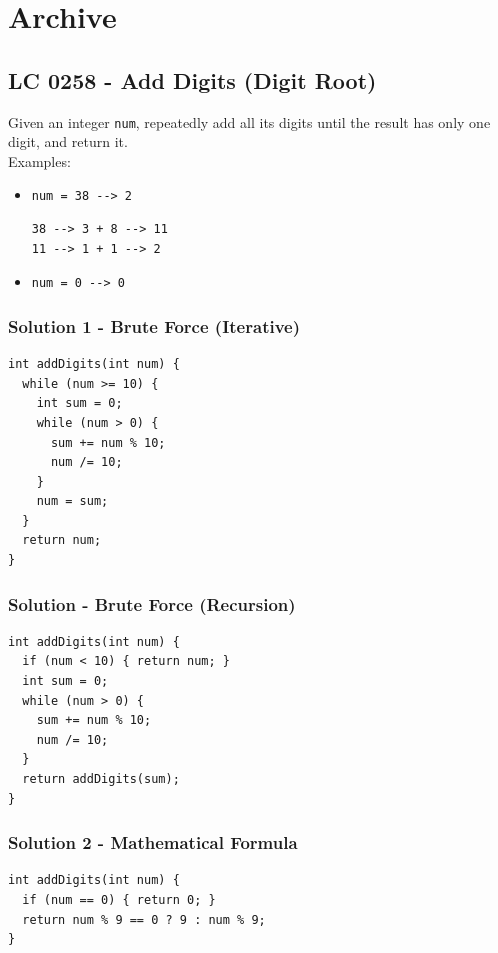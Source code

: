 \chapter{Archive}
\section{LC 0258 - Add Digits (Digit Root)}
Given an integer {\colorbox{CodeBackground}{\lstinline|num|}}, repeatedly add all its digits until the result has only one digit, and return it.\\

Examples:
\begin{itemize}
\item {\colorbox{CodeBackground}{\lstinline|num = 38 --> 2|}}
\begin{lstlisting}
38 --> 3 + 8 --> 11
11 --> 1 + 1 --> 2 
\end{lstlisting}
\item {\colorbox{CodeBackground}{\lstinline|num = 0 --> 0|}}
\end{itemize}

\subsection*{Solution 1 - Brute Force (Iterative)}\label{solution:lc0258_simulation_iterative}
\begin{lstlisting}
int addDigits(int num) {
  while (num >= 10) {
    int sum = 0;
    while (num > 0) {
      sum += num % 10;
      num /= 10;
    }
    num = sum;
  }
  return num;
}
\end{lstlisting}

\subsection*{Solution - Brute Force (Recursion)}\label{solution:lc0258_simulation_recursion}
\begin{lstlisting}
int addDigits(int num) {
  if (num < 10) { return num; }
  int sum = 0;
  while (num > 0) {
    sum += num % 10;
    num /= 10;
  }
  return addDigits(sum);
}
\end{lstlisting}

\subsection*{Solution 2 - Mathematical Formula}\label{solution:lc0258_mathematical_formula}
\begin{lstlisting}
int addDigits(int num) {
  if (num == 0) { return 0; }
  return num % 9 == 0 ? 9 : num % 9;
}
\end{lstlisting}

